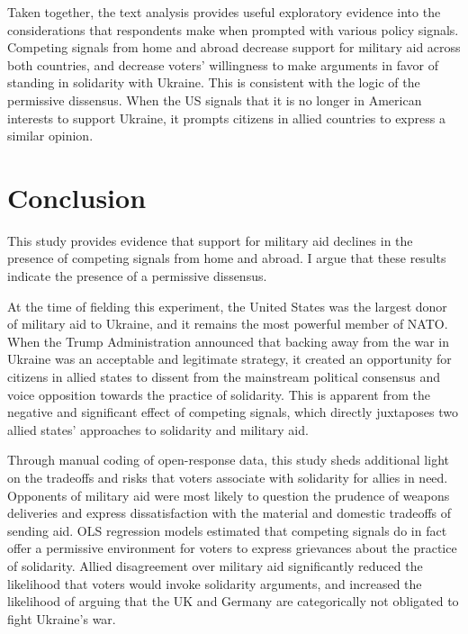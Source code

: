 Taken together, the text analysis provides useful exploratory evidence into the considerations that respondents make when prompted with various policy signals. Competing signals from home and abroad decrease support for military aid across both countries, and decrease voters' willingness to make arguments in favor of standing in solidarity with Ukraine. This is consistent with the logic of the permissive dissensus. When the US signals that it is no longer in American interests to support Ukraine, it prompts citizens in allied countries to express a similar opinion.  

\section{Conclusion}
This study provides evidence that support for military aid declines in the presence of competing signals from home and abroad. I argue that these results indicate the presence of a permissive dissensus. 

At the time of fielding this experiment, the United States was the largest donor of military aid to Ukraine, and it remains the most powerful member of NATO. When the Trump Administration announced that backing away from the war in Ukraine was an acceptable and legitimate strategy, it created an opportunity for citizens in allied states to dissent from the mainstream political consensus and voice opposition towards the practice of solidarity. This is apparent from the negative and significant effect of competing signals, which directly juxtaposes two allied states' approaches to solidarity and military aid. 

Through manual coding of open-response data, this study sheds additional light on the tradeoffs and risks that voters associate with solidarity for allies in need. Opponents of military aid were most likely to question the prudence of weapons deliveries and express dissatisfaction with the material and domestic tradeoffs of sending aid. OLS regression models estimated that competing signals do in fact offer a permissive environment for voters to express grievances about the practice of solidarity. Allied disagreement over military aid significantly reduced the likelihood that voters would invoke solidarity arguments, and increased the likelihood of arguing that the UK and Germany are categorically not obligated to fight Ukraine's war. 

